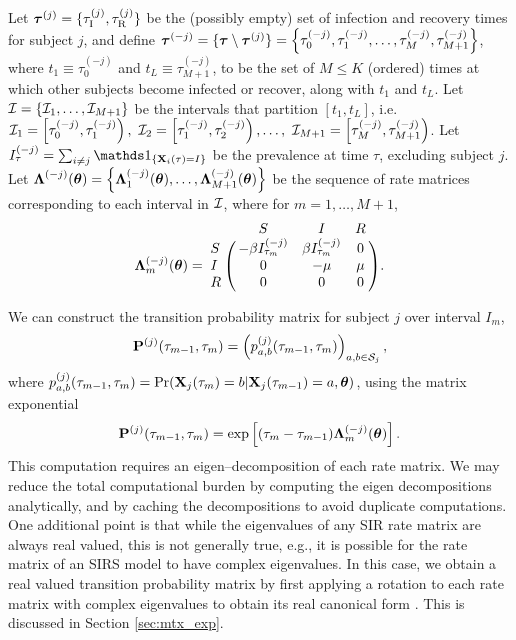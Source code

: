 Let $ \boldsymbol{\tau}^{(j)} = \lbrace \tau_\mathrm{I}^{(j)},\tau_\mathrm{R}^{(j)}\rbrace $ be the (possibly empty) set of infection and recovery times for subject $ j $, and define $ \boldsymbol{\tau}^{(-j)} = \lbrace\boldsymbol{\tau}\setminus\boldsymbol{\tau}^{(j)}\rbrace = \left \lbrace \tau_0^{(-j)} ,\tau_1^{(-j)}, \dots, \tau_{M}^{(-j)}, \tau_{M+1}^{(-j)}\right \rbrace$, where $ t_1 \equiv \tau_0^{(-j)} $ and $ t_L\equiv\tau_{M+1}^{(-j)} $, to be the set of $ M\leq K $ (ordered) times at which other subjects become infected or recover, along with $ t_1$ and $ t_L $. Let $ \mathcal{I} = \lbrace \mathcal{I}_1, \dots,\mathcal{I}_{M+1}\rbrace $ be the intervals that partition $ [t_1,t_L]$, i.e. $ \mathcal{I}_1 = \left [\tau_0^{(-j)},\tau_1^{(-j)}\right ),\ \mathcal{I}_2=\left [\tau_1^{(-j)},\tau_2^{(-j)}\right ),\dots,\ \mathcal{I}_{M+1}=\left [\tau_{M}^{(-j)},\tau_{M+1}^{(-j)}\right )$. Let $ I_\tau^{(-j)} = \sum_{i\neq j}\ind{\bX_i(\tau) = I} $ be the prevalence at time $ \tau $, excluding subject $ j $. Let $ \boldsymbol{\Lambda}^{(-j)}(\boldsymbol{\theta}) = \left \lbrace\boldsymbol{\Lambda}_1^{(-j)}(\boldsymbol{\theta}),\dots,\boldsymbol{\Lambda}_{M+1}^{(-j)}(\boldsymbol{\theta}) \right \rbrace$ be the sequence of rate matrices corresponding to each interval in $ \mathcal{I} $, where for $ m=1,\dots,M+1 $,
\begin{equation} \bLambda_m^{(-j)}(\btheta) = \bordermatrix{ & S & I & R \cr
	S & -\beta I_{\tau_m}^{(-j)} & \beta I_{\tau_m}^{(-j)} & 0 \cr 
	I & 0 & -\mu & \mu \cr
	R & 0 & 0 & 0 }.
\end{equation}

We can construct the transition probability matrix for subject $ j $ over interval $ I_m $, $$ \mathbf{P}^{(j)}(\tau_{m-1},\tau_m) = \left (
p_{a,b}^{(j)}(\tau_{m-1},\tau_m)\right )_{a,b\in \mathcal{S}_j}, $$ where $ p_{a,b}^{(j)}(\tau_{m-1},\tau_m) = \Pr(\mathbf{X}_j(\tau_m)=b|\mathbf{X}_j(\tau_{m-1})=a, \boldsymbol{\theta}) $, using the matrix exponential $$
	\mathbf{P}^{(j)} (\tau_{m-1},\tau_m)= \exp\left [(\tau_m - \tau_{m-1})\boldsymbol{\Lambda}^{(-j)}_m(\boldsymbol{\theta})\right ].
	$$
This computation requires an eigen--decomposition of each rate matrix. We may reduce the total computational burden by computing the eigen decompositions analytically, and by caching the decompositions to avoid duplicate computations. One additional point is that while the eigenvalues of any SIR rate matrix are always real valued, this is not generally true, e.g., it is possible for the rate matrix of an SIRS model to have complex eigenvalues. In this case, we obtain a real valued transition probability matrix by first applying a rotation to each rate matrix with complex eigenvalues to obtain its real canonical form \cite{hirsch2013differential}. This is discussed in Section \ref{sec:mtx_exp}.

